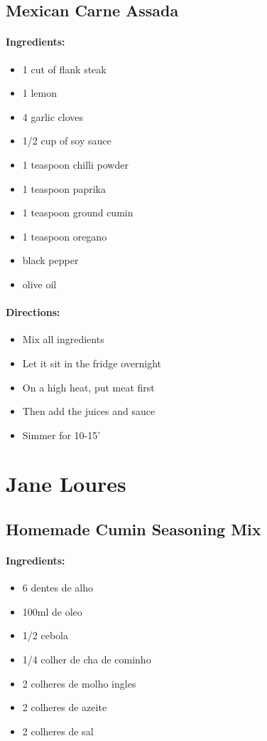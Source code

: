 \documentclass{article}
\begin{document}
\subsection{Mexican Carne Assada}

\paragraph{Ingredients:}

\begin{itemize}
	\item 1 cut of flank steak
	\item 1 lemon
	\item 4 garlic cloves
	\item 1/2 cup of soy sauce
	\item 1 teaspoon chilli powder
	\item 1 teaspoon paprika
	\item 1 teaspoon ground cumin
	\item 1 teaspoon oregano
	\item black pepper
	\item olive oil
\end{itemize}

\paragraph{Directions:}
\begin{itemize}
	\item Mix all ingredients
	\item Let it sit in the fridge overnight
	\item On a high heat, put meat first
	\item Then add the juices and sauce
	\item Simmer for 10-15'
\end{itemize}

\section{Jane Loures}

\subsection{Homemade Cumin Seasoning Mix}

\paragraph{Ingredients:}
\begin{itemize}
	\item 6 dentes de alho
	\item 100ml de oleo
	\item 1/2 cebola
	\item 1/4 colher de cha de cominho
	\item 2 colheres de molho ingles
	\item 2 colheres de azeite
	\item 2 colheres de sal
\end{itemize}
\end{document}
